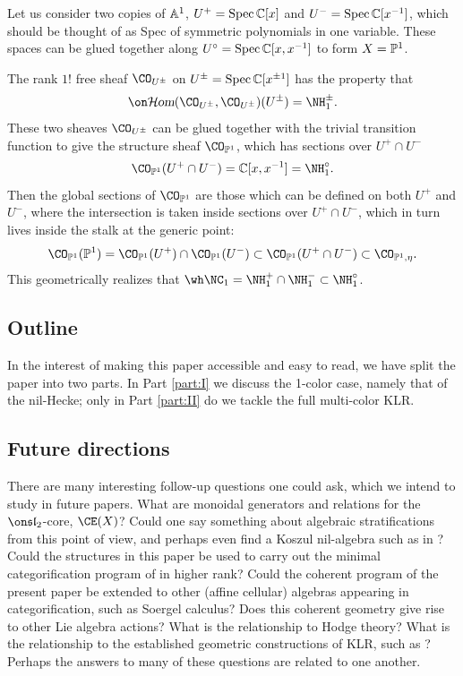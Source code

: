 \documentclass[11pt,reqno]{amsart}
\begin{document}
Let us consider two copies of $\mathbb A^1$, $U^+=\operatorname{Spec}\mathbb C[x]$ and $U^-=\operatorname{Spec}\mathbb C[x^{-1}]$, which should be thought of as Spec of symmetric polynomials in one variable. These spaces can be glued together along $U^\circ=\operatorname{Spec}\mathbb C[x,x^{-1}]$ to form $X=\mathbb P^1$. 

The rank $1!$ free sheaf $\CO_{U^\pm}$ on $U^\pm=\operatorname{Spec}\mathbb C[x^{\pm 1}]$ has the property that
\[\shom(\CO_{U^\pm},\CO_{U^\pm})(U^\pm)=\NH_1^\pm.\] 
These two sheaves $\CO_{U^\pm}$ can be glued together with the trivial transition function to give the structure sheaf $\CO_{\BP^1}$, which has sections over $U^+\cap U^-$
\[\CO_{\BP^1}(U^+\cap U^-)=\BC[x,x^{-1}]=\NH_1^\circ.\] 
Then the global sections of $\CO_{\BP^1}$ are those which can be defined on both $U^+$ and $U^-$, where the intersection is taken inside sections over $U^+\cap U^-$, which in turn lives inside the stalk at the generic point:
\[\CO_{\BP^1}(\BP^1)=\CO_{\BP^1}(U^+)\cap\CO_{\BP^1}(U^-)\subset \CO_{\BP^1}(U^+\cap U^-)\subset \CO_{\BP^1,\eta}.\] 
This geometrically realizes that $\wh\NC_1=\NH_1^+\cap \NH_1^-\subset\NH_1^\circ$. 

\subsection{Outline}
In the interest of making this paper accessible and easy to read, we have split the paper into two parts. In Part \ref{part:I} we discuss the 1-color case, namely that of the nil-Hecke; only in Part \ref{part:II} do we tackle the full multi-color KLR. 

\subsection{Future directions}
There are many interesting follow-up questions one could ask, which we intend to study in future papers. What are monoidal generators and relations for the $\sl_2$-core, $\CE(X)$? Could one say something about algebraic stratifications from this point of view, and perhaps even find a Koszul nil-algebra such as in \cite{zhou2024bgg,zhou2026bgg}? Could the structures in this paper be used to carry out the minimal categorification program of \cite{KMZ} in higher rank? Could the coherent program of the present paper be extended to other (affine cellular) algebras appearing in categorification, such as Soergel calculus? Does this coherent geometry give rise to other Lie algebra actions? What is the relationship to Hodge theory? What is the relationship to the established geometric constructions of KLR, such as \cite{varagnolo2011canonical}? Perhaps the answers to many of these questions are related to one another. 
\end{document}
